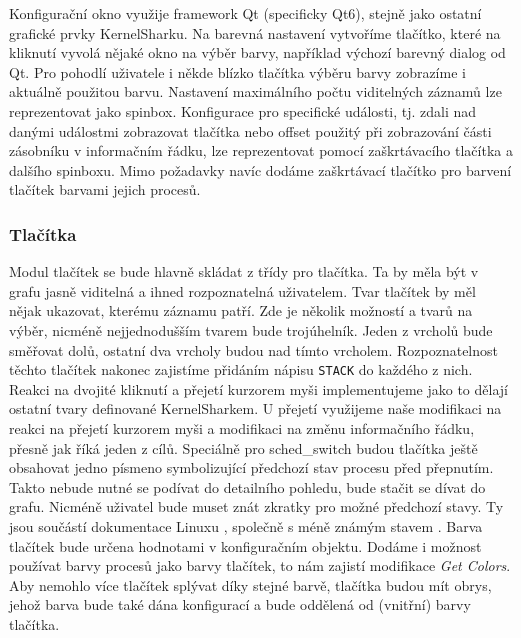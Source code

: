 Konfigurační okno využije framework Qt (specificky Qt6), stejně jako ostatní grafické prvky KernelSharku. Na barevná nastavení vytvoříme tlačítko, které na kliknutí vyvolá nějaké okno na výběr barvy, například výchozí barevný dialog od Qt. Pro pohodlí uživatele i někde blízko tlačítka výběru barvy zobrazíme i aktuálně použitou barvu. Nastavení maximálního počtu viditelných záznamů lze reprezentovat jako spinbox. Konfigurace pro specifické události, tj. zdali nad danými událostmi zobrazovat tlačítka nebo offset použitý při zobrazování části zásobníku v informačním řádku, lze reprezentovat pomocí zaškrtávacího tlačítka a dalšího spinboxu. Mimo požadavky navíc dodáme zaškrtávací tlačítko pro barvení tlačítek barvami jejich procesů.

\subsubsection{Tlačítka}
Modul tlačítek se bude hlavně skládat z třídy pro tlačítka. Ta by měla být v grafu jasně viditelná a ihned rozpoznatelná uživatelem. Tvar tlačítek by měl nějak ukazovat, kterému záznamu patří. Zde je několik možností a tvarů na výběr, nicméně nejjednodušším tvarem bude trojúhelník. Jeden z vrcholů bude směřovat dolů, ostatní dva vrcholy budou nad tímto vrcholem. Rozpoznatelnost těchto tlačítek nakonec zajistíme přidáním nápisu \texttt{STACK} do každého z nich. Reakci na dvojité kliknutí a přejetí kurzorem myši implementujeme jako to dělají ostatní tvary definované KernelSharkem. U přejetí využijeme naše modifikaci na reakci na přejetí kurzorem myši a modifikaci na změnu informačního řádku, přesně jak říká jeden z cílů. Speciálně pro sched\_switch budou tlačítka ještě obsahovat jedno písmeno symbolizující předchozí stav procesu před přepnutím. Takto nebude nutné se podívat do detailního pohledu, bude stačit se dívat do grafu. Nicméně uživatel bude muset znát zkratky pro možné předchozí stavy. Ty jsou součástí dokumentace Linuxu \cite{Process-State-Codes}, společně s méně známým stavem  \cite{Parked-Thread}. Barva tlačítek bude určena hodnotami v konfiguračním objektu. Dodáme i možnost používat barvy procesů jako barvy tlačítek, to nám zajistí modifikace \emph{Get Colors}. Aby nemohlo více tlačítek splývat díky stejné barvě, tlačítka budou mít obrys, jehož barva bude také dána konfigurací a bude oddělená od (vnitřní) barvy tlačítka.

